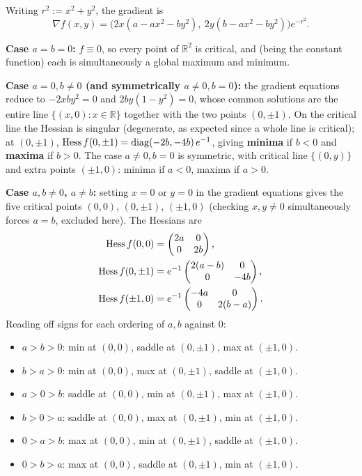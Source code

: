 \begin{exercisesolution}
\label{sol:critical_points_parameterized_gaussian}
Writing $r^2 := x^2+y^2$, the gradient is
\[\nabla f(x,y) = \big(2x(a-ax^2-by^2),\ 2y(b-ax^2-by^2)\big)e^{-r^2}.\]

\textbf{Case $a=b=0$:} $f \equiv 0$, so every point of $\mathbb{R}^2$ is critical, and (being the
constant function) each is simultaneously a global maximum and minimum.

\textbf{Case $a=0, b\neq 0$ (and symmetrically $a \neq 0, b=0$):} the gradient equations reduce to
$-2xby^2=0$ and $2by(1-y^2)=0$, whose common solutions are the entire line $\{(x,0): x\in
\mathbb{R}\}$ together with the two points $(0,\pm1)$. On the critical line the Hessian is
singular (degenerate, as expected since a whole line is critical); at $(0,\pm1)$,
$\operatorname{Hess} f(0,\pm1) = \operatorname{diag}(-2b,-4b)\,e^{-1}$, giving \textbf{minima} if $b<0$ and
\textbf{maxima} if $b>0$. The case $a\neq0,b=0$ is symmetric, with critical line $\{(0,y)\}$ and
extra points $(\pm1,0)$: minima if $a<0$, maxima if $a>0$.

\textbf{Case $a,b \neq 0$, $a \neq b$:} setting $x=0$ or $y=0$ in the gradient equations gives the
five critical points $(0,0)$, $(0,\pm1)$, $(\pm1,0)$ (checking $x,y\neq0$ simultaneously forces
$a=b$, excluded here). The Hessians are
\begin{align*}
\operatorname{Hess} f(0,0) &= \begin{pmatrix}2a&0\\0&2b\end{pmatrix}, \\
\operatorname{Hess} f(0,\pm1) &= e^{-1}\begin{pmatrix}2(a-b)&0\\0&-4b\end{pmatrix}, \\
\operatorname{Hess} f(\pm1,0) &= e^{-1}\begin{pmatrix}-4a&0\\0&2(b-a)\end{pmatrix}.
\end{align*}
Reading off signs for each ordering of $a,b$ against $0$:
\begin{itemize}
  \item $a>b>0$: min at $(0,0)$, saddle at $(0,\pm1)$, max at $(\pm1,0)$.
  \item $b>a>0$: min at $(0,0)$, max at $(0,\pm1)$, saddle at $(\pm1,0)$.
  \item $a>0>b$: saddle at $(0,0)$, min at $(0,\pm1)$, max at $(\pm1,0)$.
  \item $b>0>a$: saddle at $(0,0)$, max at $(0,\pm1)$, min at $(\pm1,0)$.
  \item $0>a>b$: max at $(0,0)$, min at $(0,\pm1)$, saddle at $(\pm1,0)$.
  \item $0>b>a$: max at $(0,0)$, saddle at $(0,\pm1)$, min at $(\pm1,0)$.
\end{itemize}


\end{exercisesolution}
